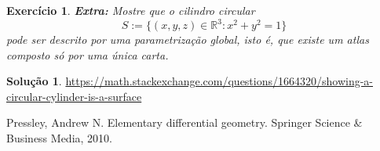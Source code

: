 \documentclass[a4paper,12pt]{article}
\newcommand{\R}{\mathbb{R}}
\theoremstyle{exer}
\newtheorem{exercise}{Exercício}
\theoremstyle{definition}
\newtheorem{solution}{Solução}
\theoremstyle{plain}
\begin{document}
\begin{exercise}
    {\bf Extra:} Mostre que o cilindro circular
    $$
    S := \{(x, y, z) \in \R^3 : x^2 + y^2 = 1\}
    $$
    pode ser descrito por uma parametrização global, isto é, que existe um
    atlas composto só por uma única carta.
\end{exercise}

\begin{solution}
    \url{https://math.stackexchange.com/questions/1664320/showing-a-circular-cylinder-is-a-surface}
\end{solution}


\begin{thebibliography}{9}
    Pressley, Andrew N. Elementary differential geometry. Springer Science \& Business Media, 2010.
\end{thebibliography}
\end{document}
